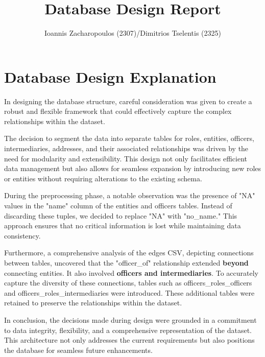 \documentclass{article}
\title{Database Design Report}
\author{Ioannis Zacharopoulos (2307)/Dimitrios Tselentis (2325)}
\begin{document}
\maketitle

\section*{\centering Database Design Explanation}

In designing the database structure, careful consideration was given to create a robust and flexible framework that could effectively capture the complex relationships within the dataset.

The decision to segment the data into separate tables for roles, entities, officers, intermediaries, addresses, and their associated relationships was driven by the need for modularity and extensibility. This design not only facilitates efficient data management but also allows for seamless expansion by introducing new roles or entities without requiring alterations to the existing schema.

During the preprocessing phase, a notable observation was the presence of "NA" values in the "name" column of the entities and officers tables. Instead of discarding these tuples, we decided to replace "NA" with "no\_name." This approach ensures that no critical information is lost while maintaining data consistency.

Furthermore, a comprehensive analysis of the edges CSV, depicting connections between tables, uncovered that the "officer\_of" relationship extended \textbf{beyond} connecting entities. It also involved \textbf{officers and intermediaries}. To accurately capture the diversity of these connections, tables such as officers\_roles\_officers and officers\_roles\_intermediaries were introduced. These additional tables were retained to preserve the relationships within the dataset.

In conclusion, the decisions made during design were grounded in a commitment to data integrity, flexibility, and a comprehensive representation of the dataset. This architecture not only addresses the current requirements but also positions the database for seamless future enhancements.
\end{document}
